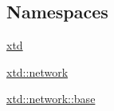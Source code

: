 \subsection*{Namespaces}
\begin{DoxyCompactItemize}
\item 
 \hyperlink{namespacextd}{xtd}
\item 
 \hyperlink{namespacextd_1_1network}{xtd\+::network}
\item 
 \hyperlink{namespacextd_1_1network_1_1base}{xtd\+::network\+::base}
\end{DoxyCompactItemize}
